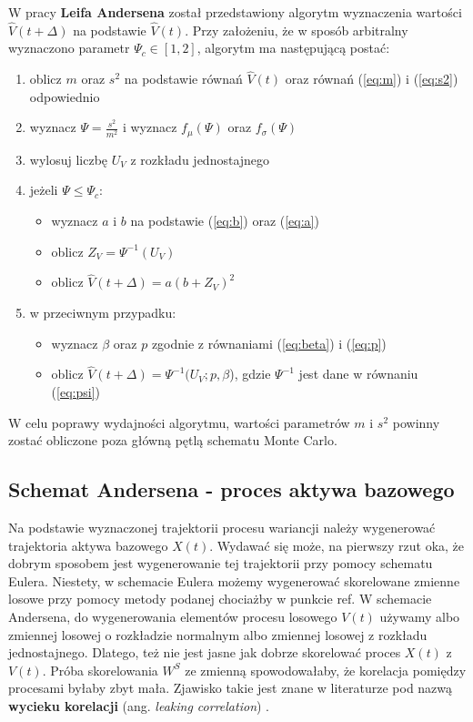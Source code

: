 \documentclass{pracamgr}
\begin{document}
W pracy \textbf{Leifa Andersena} \cite{Andersen} został 
przedstawiony algorytm wyznaczenia 
wartości $\hat{V}(t + \Delta)$ na podstawie $\hat{V}(t)$. Przy założeniu, 
że w sposób arbitralny wyznaczono parametr $\Psi_c \in [1,2]$, algorytm 
ma następującą postać:

\begin{enumerate}
  \item oblicz $m$ oraz $s^2$ na podstawie równań $\hat{V}(t)$ oraz równań (\ref{eq:m}) i (\ref{eq:s2}) odpowiednio
  \item wyznacz $\Psi = \frac{s^2}{m^2}$ i wyznacz $f_{\mu}(\Psi)$ oraz $f_{\sigma}(\Psi)$ 
  \item wylosuj liczbę $U_V$ z rozkładu jednostajnego
  \item jeżeli $\Psi \leq \Psi_c$:
  \begin{itemize} 
  \item wyznacz $a$ i $b$ na podstawie (\ref{eq:b}) oraz (\ref{eq:a})
  \item oblicz $Z_V = \Psi^{-1}(U_V)$
  \item oblicz $\hat{V}(t + \Delta)  = a(b+ Z_V)^2$
  \end{itemize}
  \item w przeciwnym przypadku:
    \begin{itemize} 
  \item wyznacz $\beta$ oraz $p$ zgodnie z równaniami (\ref{eq:beta}) i (\ref{eq:p})
  \item oblicz $\hat{V}(t + \Delta)  =\Psi^{-1}(U_V;p,\beta$), gdzie $\Psi^{-1}$ jest dane w równaniu (\ref{eq:psi})
  \end{itemize}
  
\end{enumerate}


W celu poprawy wydajności algorytmu, wartości parametrów $m$ i $s^2$ powinny zostać obliczone poza 
główną pętlą schematu Monte Carlo.



\subsection{Schemat Andersena - proces aktywa bazowego}

Na podstawie wyznaczonej trajektorii procesu wariancji należy wygenerować trajektoria aktywa bazowego 
$X(t)$. Wydawać się może, na pierwszy rzut oka, że dobrym sposobem jest wygenerowanie tej trajektorii 
przy pomocy schematu Eulera. Niestety, w schemacie Eulera możemy wygenerować skorelowane zmienne 
losowe przy pomocy metody podanej chociażby w punkcie ref.
W schemacie Andersena, do wygenerowania elementów procesu losowego $V(t)$ używamy albo zmiennej 
losowej o rozkładzie normalnym albo zmiennej losowej z rozkładu jednostajnego. Dlatego, też nie jest 
jasne jak dobrze skorelować proces $X(t)$ z $V(t)$. Próba skorelowania $W^S$ ze zmienną 
spowodowałaby, że korelacja pomiędzy procesami byłaby zbyt mała. Zjawisko takie jest znane w 
literaturze pod nazwą \textbf{wycieku korelacji} 
(ang. \textit{leaking correlation}) \cite{Andersen}. 
\end{document}
